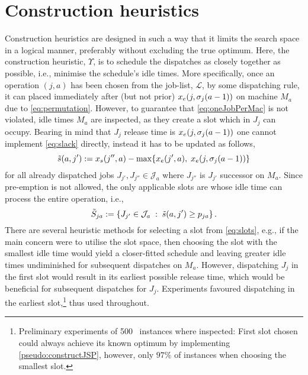 \section{Construction heuristics}\label{sec:CH}
Construction heuristics are designed in such a way that it limits the search 
space in a logical manner, preferably without excluding the true optimum. 
Here, the construction heuristic, $\Upsilon$, is to schedule the dispatches as 
closely together as possible, i.e., minimise the schedule's idle times. 
More specifically, once an operation $(j,a)$ has been chosen from the job-list, 
$\mathcal{L}$, by some dispatching rule, it can placed immediately after (but 
not prior) $x_e(j,{\mathbf{\sigma}}_j(a-1))$ on machine $M_a$ due to 
\cref{eq:permutation}.
However, to guarantee that \cref{eq:oneJobPerMac} is not violated, 
idle times $M_a$ are inspected, as they create a slot which in $J_j$ can 
occupy. Bearing in mind that $J_j$ release time is $x_e(j,{\mathbf{\sigma}}_j(a-1))$ one 
cannot implement \cref{eq:slack} directly, instead it has to be updated as 
follows,
\begin{equation}
\tilde{s}(a,j') := x_s(j'',a)-\max\{x_e(j',a),\;x_e(j,\vsigma_j(a-1))\} %
\end{equation}
for all already dispatched jobs $J_{j'},J_{j''}\in \mathcal{J}_a$ where 
$J_{j''}$ is $J_{j'}$ successor on $M_a$. Since pre-emption is not allowed, the 
only applicable slots are whose idle time can process the entire operation, 
i.e.,
\begin{equation}
\tilde{S}_{ja} := \condset{J_{j'}\in \mathcal{J}_a}{\tilde{s}(a,j')\geq 
    p_{ja} }\label{eq:slots}.
\end{equation} 
There are several heuristic methods for selecting a slot from 
\cref{eq:slots}, e.g., if the main concern were to utilise the slot space, then 
choosing the slot with the smallest idle time would yield a closer-fitted 
schedule and leaving greater idle times undiminished for subsequent dispatches 
on $M_a$. However, dispatching $J_j$ in the first slot would result in its 
earliest possible release time, which would be beneficial for subsequent 
dispatches for $J_j$. Experiments favoured dispatching in the 
earliest slot,\footnote{Preliminary experiments of 500 \JSP\ instances where 
    inspected: First slot chosen could always achieve its known optimum by 
    implementing \cref{pseudo:constructJSP}, however, only $97\%$ of
    instances when choosing the smallest slot.} 
thus used throughout.

